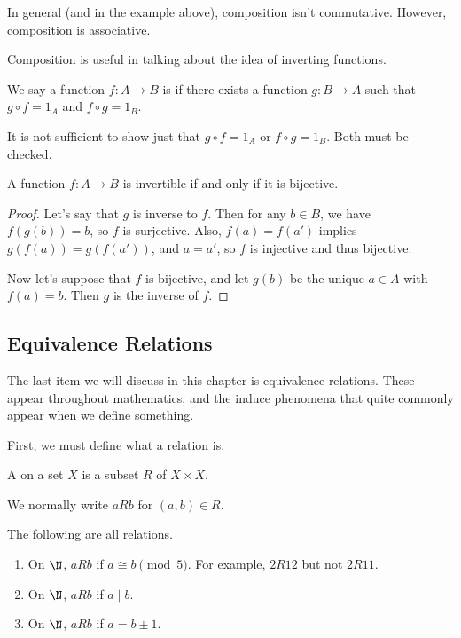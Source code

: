\documentclass[a4paper]{scrartcl}
\begin{document}
In general (and in the example above), composition isn't commutative. However, composition is associative.

Composition is useful in talking about the idea of inverting functions.

\begin{definition}
	We say a function $f: A \rightarrow B$ is  if there exists a function $g: B \rightarrow A$ such that $g \circ f = 1_A$ and $f \circ g = 1_B$.
\end{definition}

\begin{remark}
	It is not sufficient to show just that $g \circ f = 1_A$ or $f \circ g = 1_B$. Both must be checked.
\end{remark}

\begin{proposition}
	A function $f : A \rightarrow B$ is invertible if and only if it is bijective.
\end{proposition}
\begin{proof}
	Let's say that $g$ is inverse to $f$. Then for any $b \in B$, we have $f(g(b)) = b$, so $f$ is surjective. Also, $f(a) = f(a')$ implies $g(f(a)) = g(f(a'))$, and $a = a'$, so $f$ is injective and thus bijective.

	Now let's suppose that $f$ is bijective, and let $g(b)$ be the unique $a \in A$ with $f(a) = b$. Then $g$ is the inverse of $f$.
\end{proof}

\subsection{Equivalence Relations}

The last item we will discuss in this chapter is equivalence relations. These appear throughout mathematics, and the induce phenomena that quite commonly appear when we define something. 

First, we must define what a relation is.

\begin{definition}[Relation]
	A  on a set $X$ is a subset $R$ of $X \times X$.
\end{definition}
We normally write $a R b$ for $(a, b) \in R$.

\begin{example}
	The following are all relations.
	\begin{enumerate}[label=(\roman*)]
		\item On $\N$, $a R b$ if $a \cong b \pmod{5}$. For example, $2 R 12$ but not $2 R 11$.
		\item On $\N$, $aR b$ if $a \mid b$.
		\item On $\N$, $aRb$ if $a = b \pm 1$.
	\end{enumerate}
\end{example}
\end{document}

